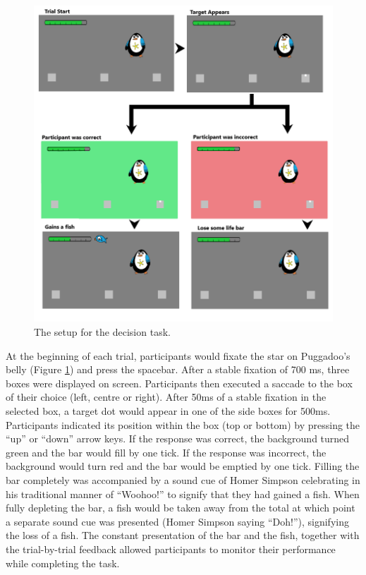 \documentclass[vision,article,submit,moreauthors,pdftex,10pt,a4paper]{mdpi}
\begin{document}
\begin{figure}[H]
	\centering
	\includegraphics[scale=.5]{../Figures/Part2_timeline_full.png}
	\caption{The setup for the decision task.}
	\label{fig:Part2}
\end{figure} 

At the beginning of each trial, participants would fixate the star on Puggadoo’s belly (Figure \ref{fig:Part2}) and press the spacebar. After a stable fixation of 700 ms, three boxes were displayed on screen. Participants then executed a saccade to the box of their choice (left, centre or right). After 50ms of a stable fixation in the selected box, a target dot would appear in one of the side boxes for 500ms. Participants indicated its position within the box (top or bottom) by pressing the “up” or “down” arrow keys. If the response was correct, the background turned green and the bar would fill by one tick. If the response was incorrect, the background would turn red and the bar would be emptied by one tick. Filling the bar completely was accompanied by a sound cue of Homer Simpson celebrating in his traditional manner of “Woohoo!” to signify that they had gained a fish. When fully depleting the bar, a fish would be taken away from the total at which point a separate sound cue was presented (Homer Simpson saying “Doh!”), signifying the loss of a fish. The constant presentation of the bar and the fish, together with the trial-by-trial feedback allowed participants to monitor their performance while completing the task.
\end{document}
